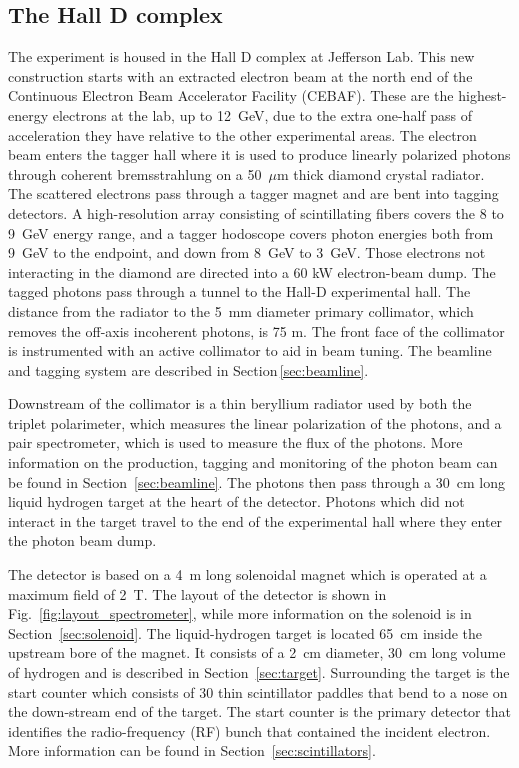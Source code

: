\subsection[The Hall D complex]{The Hall D complex \label{sec:gluexexperiment:complex}}
The \gx{} experiment is housed in the Hall D complex at Jefferson Lab. This new construction starts with an extracted electron beam at the north end of the Continuous Electron Beam Accelerator Facility (CEBAF). These are the highest-energy electrons at the lab, up to 12~GeV, due to the extra one-half pass of acceleration they have relative to the other experimental areas. The electron beam enters the tagger hall where it is used to produce linearly polarized photons through coherent bremsstrahlung on a 50~$\mu$m thick diamond crystal radiator.
The scattered electrons pass through a tagger magnet and are bent into tagging detectors. A high-resolution array consisting of scintillating fibers covers the 8 to 9~GeV energy range, and a tagger hodoscope covers photon energies both from 9~GeV to the endpoint, and down from 8~GeV to 3~GeV. Those electrons not interacting in the diamond are directed into a 60 kW electron-beam dump. The tagged photons pass through a tunnel to the Hall-D experimental hall. The distance from the radiator to the 5~mm diameter primary collimator, which removes the off-axis incoherent photons, is 75 m. The front face of the collimator is instrumented with an active collimator to aid in beam tuning.  The beamline and tagging system are described in Section\,\ref{sec:beamline}.

Downstream of the collimator is a thin beryllium radiator used by both the triplet polarimeter, which measures the linear polarization of the photons, and a pair spectrometer, which is used to measure the flux of the photons. More information on the production, tagging and monitoring of the photon beam can be found in Section~\ref{sec:beamline}. The photons then pass through a 30~cm long liquid hydrogen target at the heart of the \gx{} detector. Photons which did not interact in the target travel to the end of the experimental hall where they enter the photon beam dump.

The \gx{} detector is based on a 4~m long solenoidal magnet which is operated at a maximum field of 2~T. The layout of the detector is shown in Fig.~\ref{fig:layout_spectrometer}, while more information on the solenoid is in Section~\ref{sec:solenoid}. The liquid-hydrogen target is located 65~cm inside the upstream bore of the magnet. It consists of a 2~cm diameter, 30~cm long volume of hydrogen and is described in Section~\ref{sec:target}. Surrounding the target is the start counter which consists of 30 thin scintillator paddles that bend to a nose on the down-stream end of the target. The start counter is the primary detector that identifies the radio-frequency (RF) bunch that contained the incident electron. More information can be found in Section~\ref{sec:scintillators}. 

